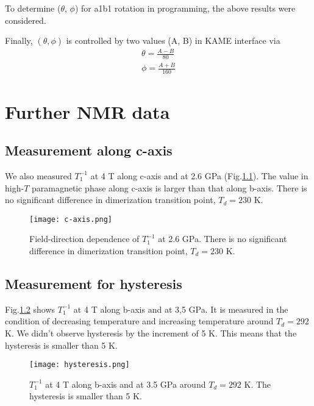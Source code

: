 \documentclass[a4,10.5pt]{report}
\begin{document}
To determine ($\theta$, $\phi$) for a1b1 rotation in programming, the above results were considered. 

Finally, $(\theta,\phi)$ is controlled by two values (A, B) in KAME interface via
\begin{align}
\theta = \frac{A-B}{80} \\
\phi = \frac{A+B}{160}
\end{align}

\chapter{Further NMR data}
\section{Measurement along c-axis}
We also measured $T^{-1}_1$ at 4 T along c-axis and at 2.6 GPa (Fig.\ref{c-axis}).
The value in high-$T$ paramagnetic phase along c-axis is larger than that along b-axis.
There is no significant difference in dimerization transition point, $T_d = 230$ K.

\begin{figure}
  \centering
  \texttt{[image: c-axis.png]}
  \caption{Field-direction dependence of $T^{-1}_1$ at 2.6 GPa.
  There is no significant difference in dimerization transition point, $T_d = 230$ K.} 
  \label{c-axis}
\end{figure}

\section{Measurement for hysteresis}
Fig.\ref{hysteresis} shows $T^{-1}_1$ at 4 T along b-axis and at 3,5 GPa.
It is measured in the condition of decreasing temperature and increasing temperature around $T_d = 292$ K.
We didn't observe hysteresis by the increment of 5 K.
This means that the hysteresis is smaller than 5 K.

\begin{figure}
  \centering
  \texttt{[image: hysteresis.png]}
  \caption{$T^{-1}_1$ at 4 T along b-axis and at 3.5 GPa around $T_d = 292$ K.
  The hysteresis is smaller than 5 K.} 
  \label{hysteresis}
\end{figure}
\end{document}
